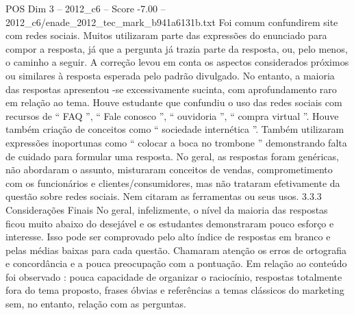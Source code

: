 \begin{textsample}{POS Dim 3 – 2012\_c6 – Score -7.00 – 2012\_c6/enade\_2012\_tec\_mark\_b941a6131b.txt}
Foi comum confundirem site com redes sociais.
Muitos utilizaram parte das expressões do enunciado para compor a resposta, já que a pergunta já trazia parte da resposta, ou, pelo menos, o caminho a seguir.
A correção levou em conta os aspectos considerados próximos ou similares à resposta esperada pelo padrão divulgado.
No entanto, a maioria das respostas apresentou -se excessivamente sucinta, com aprofundamento raro em relação ao tema.
Houve estudante que confundiu o uso das redes sociais com recursos de “ FAQ ”, “ Fale conosco ”, “ ouvidoria ”, “ compra virtual ”.
Houve também criação de conceitos como “ sociedade internética ”.
Também utilizaram expressões inoportunas como “ colocar a boca no trombone ” demonstrando falta de cuidado para formular uma resposta.
No geral, as respostas foram genéricas, não abordaram o assunto, misturaram conceitos de vendas, comprometimento com os funcionários e clientes/consumidores, mas não trataram efetivamente da questão sobre redes sociais.
Nem citaram as ferramentas ou seus usos. 3.3.3 Considerações Finais No geral, infelizmente, o nível da maioria das respostas ficou muito abaixo do desejável e os estudantes demonstraram pouco esforço e interesse.
Isso pode ser comprovado pelo alto índice de respostas em branco e pelas médias baixas para cada questão.
Chamaram atenção os erros de ortografia e concordância e a pouca preocupação com a pontuação.
Em relação ao conteúdo foi observado : pouca capacidade de organizar o raciocínio, respostas totalmente fora do tema proposto, frases óbvias e referências a temas clássicos do marketing sem, no entanto, relação com as perguntas.

\end{textsample}

